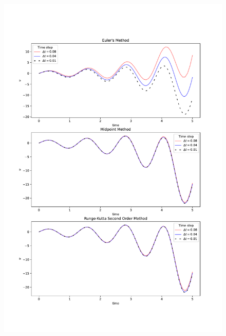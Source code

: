 \documentclass[a4paper,12pt]{article}
\begin{document}
\begin{figure}[!h]
  \centering
  \includegraphics[scale = 0.5]{3a.pdf}
\end{figure}
\end{document}

